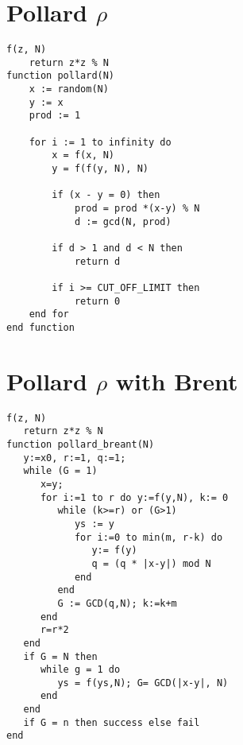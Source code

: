 \documentclass[a4paper, 12pt]{report}
\begin{document}
\section{Pollard $\rho$}
\begin{lstlisting}[frame=single] 
f(z, N)
	return z*z % N
function pollard(N) 
	x := random(N) 
	y := x 	
	prod := 1

	for i := 1 to infinity do
		x = f(x, N)
		y = f(f(y, N), N)

		if (x - y = 0) then
			prod = prod *(x-y) % N
			d := gcd(N, prod)

		if d > 1 and d < N then
			return d

		if i >= CUT_OFF_LIMIT then
			return 0
	end for
end function
\end{lstlisting}

\section{Pollard $\rho$ with Brent}
\begin{lstlisting}[frame=single]
f(z, N)
   return z*z % N
function pollard_breant(N)
   y:=x0, r:=1, q:=1;
   while (G = 1)
      x=y;
      for i:=1 to r do y:=f(y,N), k:= 0
         while (k>=r) or (G>1)
            ys := y
            for i:=0 to min(m, r-k) do
               y:= f(y)
               q = (q * |x-y|) mod N
            end
         end
         G := GCD(q,N); k:=k+m
      end
      r=r*2
   end
   if G = N then
      while g = 1 do
         ys = f(ys,N); G= GCD(|x-y|, N)
      end
   end
   if G = n then success else fail
end
\end{lstlisting}
\end{document}
